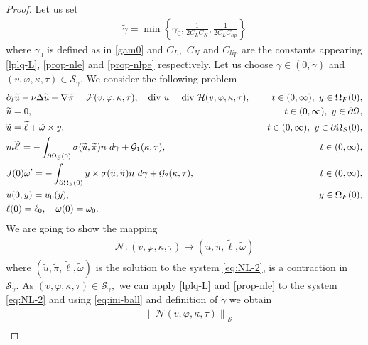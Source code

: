 \documentclass[12pt,a4paper,reqno]{amsart}
\theoremstyle{definition}
\theoremstyle{remark}
\numberwithin{equation}{section}
\newcommand{\oso}{\Omega_{S}(0)}
\newcommand{\ofo}{\Omega_{F}(0)}
\newcommand{\poso}{\partial\oso}
\begin{document}
\begin{proof}
Let us set
\begin{align}
\widetilde \gamma = \min \left\{ \gamma_{0}, \frac{1}{2C_{L} C_{N}}, \frac{1}{2C_{L} C_{lip}}\right\}
\end{align}
where $\gamma_{0}$ is defined as in \eqref{gam0} and $C_{L},$ $C_{N}$ and $C_{lip}$ are the constants  appearing \cref{lplq-L}, \cref{prop-nle} and \cref{prop-nlpe} respectively. Let us choose $\gamma \in (0,\widetilde \gamma)$ and  $(v, \varphi, \kappa, \tau) \in \mathcal{S}_{\gamma}.$ We consider the following problem
\begin{alignat}{2} \label{eq:NL-2}
&\partial_{t} \widetilde u - \nu \Delta \widetilde u + \nabla \widetilde \pi  = \mathcal{F}(v, \varphi, \kappa, \tau) , \quad \mathrm{div} \ u = \mathrm{div} \ \mathcal{H}(v, \varphi, \kappa, \tau),  & \quad t\in   (0,\infty), \ y \in\ofo, \notag \\
& \widetilde u = 0,  & t\in   (0,\infty), \ y \in \partial\Omega,\notag  \\
&  \widetilde u  = \widetilde \ell  + \widetilde \omega \times y, & \quad t\in  (0,\infty),  \ y \in \poso, \notag \\
&  m\widetilde \ell' =  -  \int_{\partial \Omega_{S}(0)}  \sigma(\widetilde u,\widetilde \pi) n \ d\gamma  +  \mathcal{G}_{1}(\kappa, \tau), & \quad t \in (0,\infty), \\
&  J(0) \widetilde\omega '=  - \int_{\partial \Omega_{S}(0)} y \times   \sigma(\widetilde u,\widetilde \pi)n \ d\gamma + \mathcal{G}_{2}(\kappa, \tau), &  \quad t \in (0,\infty), \notag \\
&  u (0,y) = u_{0}(y), & y \in  \Omega_{F}(0),  \notag \\
&  \ell(0) = \ell_{0},  \quad  \omega(0) = \omega_{0}.  \notag
\end{alignat}
We are going to show the mapping
\begin{align*}
\mathcal{N}: (v, \varphi, \kappa, \tau)  \mapsto (\widetilde u,\widetilde \pi,\widetilde \ell,\widetilde \omega)
\end{align*}
where $(\widetilde u,\widetilde \pi,\widetilde \ell,\widetilde \omega) $ is the solution to the system \eqref{eq:NL-2}, is a contraction in $\mathcal{S}_{\gamma}.$  As $(v, \varphi, \kappa, \tau) \in \mathcal{S}_{\gamma},$ we can apply \cref{lplq-L} and \cref{prop-nle} to the system \eqref{eq:NL-2} and using \eqref{eq:ini-ball}  and definition of $\widetilde \gamma$ we obtain
\begin{align*}
&\left\|\mathcal{N}(v, \varphi, \kappa, \tau)  \right\|_{\mathcal{S}}\\

\end{align*}
\end{proof}
\end{document}
